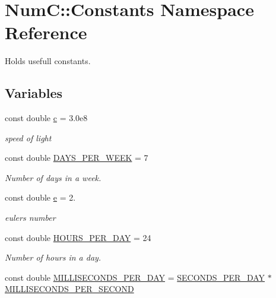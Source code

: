 \hypertarget{namespace_num_c_1_1_constants}{}\section{NumC\+:\+:Constants Namespace Reference}
\label{namespace_num_c_1_1_constants}


Holds usefull constants.  


\subsection*{Variables}
\begin{DoxyCompactItemize}
\item 
const double \mbox{\hyperlink{namespace_num_c_1_1_constants_ac5efd1bc05e0c8ef494a4d31c785f3b4}{c}} = 3.\+0e8
\begin{DoxyCompactList}\small\item\em speed of light \end{DoxyCompactList}\item 
const double \mbox{\hyperlink{namespace_num_c_1_1_constants_af5a30002b60b03726aa0049a6e065270}{D\+A\+Y\+S\+\_\+\+P\+E\+R\+\_\+\+W\+E\+EK}} = 7
\begin{DoxyCompactList}\small\item\em Number of days in a week. \end{DoxyCompactList}\item 
const double \mbox{\hyperlink{namespace_num_c_1_1_constants_ad23ede271b96029153a807d9ddf4f795}{e}} = 2.
\begin{DoxyCompactList}\small\item\em eulers number \end{DoxyCompactList}\item 
const double \mbox{\hyperlink{namespace_num_c_1_1_constants_a56c169b380c3327b81d5c10f9ae8cc09}{H\+O\+U\+R\+S\+\_\+\+P\+E\+R\+\_\+\+D\+AY}} = 24
\begin{DoxyCompactList}\small\item\em Number of hours in a day. \end{DoxyCompactList}\item 
const double \mbox{\hyperlink{namespace_num_c_1_1_constants_a32e3b2fc88b00a2bfdcf91b017e3868b}{M\+I\+L\+L\+I\+S\+E\+C\+O\+N\+D\+S\+\_\+\+P\+E\+R\+\_\+\+D\+AY}} = \mbox{\hyperlink{namespace_num_c_1_1_constants_a0679151e1b64bb3d5a0d005893a4fe3e}{S\+E\+C\+O\+N\+D\+S\+\_\+\+P\+E\+R\+\_\+\+D\+AY}} $\ast$ \mbox{\hyperlink{namespace_num_c_1_1_constants_afd12b2de704ba918ed887fac0eb2600f}{M\+I\+L\+L\+I\+S\+E\+C\+O\+N\+D\+S\+\_\+\+P\+E\+R\+\_\+\+S\+E\+C\+O\+ND}}

\end{DoxyCompactItemize}
